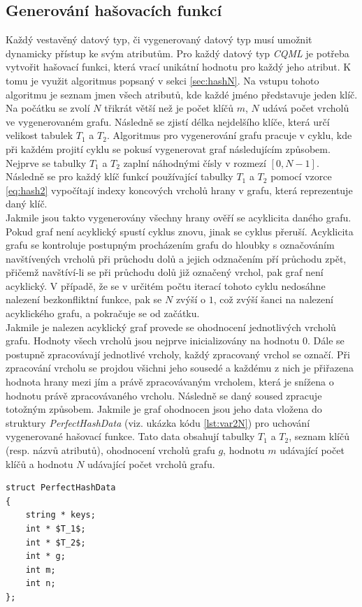 \documentclass[11pt,twoside,a4paper]{book}
\begin{document}
\subsection{\label{sec:hashN}Generování hašovacích funkcí}
Každý vestavěný datový typ, či vygenerovaný datový typ musí umožnit dynamicky přístup ke svým atributům.
Pro každý datový typ \textit{CQML} je potřeba vytvořit hašovací funkci, která vrací unikátní hodnotu pro každý jeho atribut. K tomu je využit algoritmus popsaný v sekci \ref{sec:hashN}. Na vstupu tohoto algoritmu je seznam jmen všech atributů, kde každé jméno představuje jeden klíč. Na počátku se zvolí $N$ třikrát větší než je počet klíčů $m$, $N$ udává počet vrcholů ve vygenerovaném grafu. Následně se zjistí délka nejdelšího klíče, která určí velikost tabulek $T_1$ a $T_2$. Algoritmus pro vygenerování grafu pracuje v cyklu, kde při každém projití cyklu se pokusí vygenerovat graf následujícím způsobem.
Nejprve se tabulky $T_1$ a $T_2$ zaplní náhodnými čísly v rozmezí $[0,N-1]$. Následně se pro každý klíč funkcí používající tabulky $T_1$ a $T_2$ pomocí vzorce \ref{eq:hash2} vypočítají indexy koncových vrcholů hrany v grafu, která reprezentuje daný klíč.\\
Jakmile jsou takto vygenerovány všechny hrany ověří se acyklicita daného grafu. Pokud graf není acyklický spustí cyklus znovu, jinak se cyklus přeruší. Acyklicita grafu se kontroluje postupným procházením grafu do hloubky s označováním navštívených vrcholů při průchodu dolů a jejich odznačením pří průchodu zpět, přičemž navštíví-li se při průchodu dolů již označený vrchol, pak graf není acyklický.
V případě, že se v určitém počtu iterací tohoto cyklu nedosáhne nalezení bezkonfliktní funkce, pak se $N$ zvýší o $1$, což zvýší šanci na nalezení acyklického grafu, a pokračuje se od začátku.\\
Jakmile je nalezen acyklický graf provede se ohodnocení jednotlivých vrcholů grafu. Hodnoty všech vrcholů jsou nejprve inicializovány na hodnotu $0$. Dále se postupně zpracovávají jednotlivé vrcholy, každý zpracovaný vrchol se označí. Při zpracování vrcholu se projdou všichni jeho sousedé a každému z nich je přiřazena hodnota hrany mezi jím a právě zpracovávaným vrcholem, která je snížena o hodnotu právě zpracovávaného vrcholu. Následně se daný soused zpracuje totožným způsobem. Jakmile je graf ohodnocen jsou jeho data vložena do struktury \textit{PerfectHashData} (viz. ukázka kódu \ref{lst:var2N}) pro uchování vygenerované hašovací funkce. Tato data obsahují tabulky $T_1$ a $T_2$, seznam klíčů (resp. názvů atributů), ohodnocení vrcholů grafu $g$, hodnotu $m$ udávající počet klíčů a hodnotu $N$ udávající počet vrcholů grafu.
\begin{lstlisting}[frame=single,caption=Struktura pro uchování hašovací funkce.,label=lst:var2N]
struct PerfectHashData
{
	string * keys;
	int * $T_1$;
	int * $T_2$;
	int * g;
	int m;
	int n;
};
\end{lstlisting}
\end{document}
